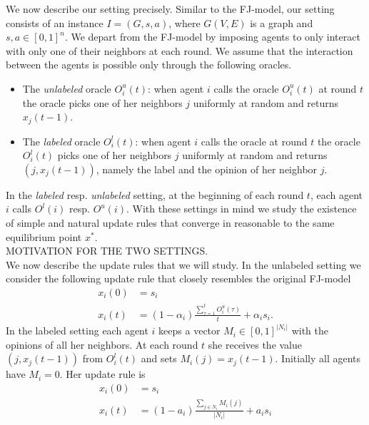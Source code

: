 We now describe our setting precisely. Similar to the FJ-model, our setting consists
of an instance $I = (G, s, a)$, where $G(V,E)$ is a graph and $s, a \in [0,1]^n$.
We depart from the FJ-model by imposing agents to only interact with only one of
their neighbors at each round.  We assume that the interaction between the agents
is possible only through the following oracles.
\begin{itemize}
  \item The \emph{unlabeled} oracle $O^u_i(t)$: when
    agent $i$ calls the oracle $O^u_i(t)$ at round $t$ the oracle picks one
    of her neighbors $j$ uniformly at random and returns $x_j(t-1)$.
  \item   The \emph{labeled} oracle $O^l_i(t)$: when
    agent $i$ calls the oracle at round $t$ the oracle $O^l_i(t)$ picks one
    of her neighbors $j$ uniformly at random and returns $(j, x_j(t-1))$,
    namely the label and the opinion of her neighbor $j$.
\end{itemize}
In the \emph{labeled} resp. \emph{unlabeled} setting, at the beginning of each
round $t$, each agent $i$ calls $O^l(i)$ resp. $O^u(i)$.
With these settings in mind we study the existence of simple
and natural update rules that converge in reasonable to the same
equilibrium point $x^*$.
\\
MOTIVATION FOR THE TWO SETTINGS.
\\
We now describe the update rules that we will study.  In the unlabeled setting
we consider the following update rule that closely resembles the original
FJ-model
\begin{align}
  x_i(0) &= s_i \nonumber \\
  x_i(t) &=
  (1-\alpha_i)\frac{\sum_{\tau=1}^{t} O^u_i(\tau)}{t} + \alpha_i s_i.
  \label{eq:unlabeled_update_rule}
\end{align}
In the labeled setting each agent $i$ keeps a vector $M_i \in [0,1]^{|N_i|}$
with the opinions of all her neighbors. At each round $t$ she receives the
value $(j, x_j(t-1))$ from $O_i^l(t)$ and sets $M_i(j) = x_j(t-1)$. Initially
all agents have $M_i = 0$. Her update rule is
\begin{align}
  x_i(0) &= s_i \nonumber \\
  x_i(t) &=  (1-a_i) \frac{\sum_{j\in N_i} M_i(j)}{|N_i|} + a_i s_i
  \label{eq:labeled_update_rule}
\end{align}


